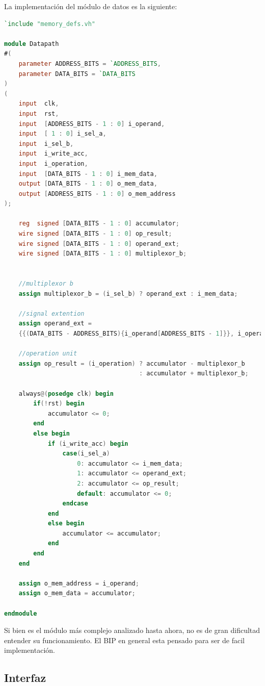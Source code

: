 \documentclass{article}
\begin{document}
\noindent La implementación del módulo de datos es la siguiente:

\begin{shaded}
\begin{lstlisting}[language=Verilog]
`include "memory_defs.vh"

module Datapath
#(
    parameter ADDRESS_BITS = `ADDRESS_BITS,
    parameter DATA_BITS = `DATA_BITS
)
(
    input  clk,
    input  rst,
    input  [ADDRESS_BITS - 1 : 0] i_operand,
    input  [ 1 : 0] i_sel_a,
    input  i_sel_b,
    input  i_write_acc,
    input  i_operation,
    input  [DATA_BITS - 1 : 0] i_mem_data,
    output [DATA_BITS - 1 : 0] o_mem_data,
    output [ADDRESS_BITS - 1 : 0] o_mem_address
);

    reg  signed [DATA_BITS - 1 : 0] accumulator;
    wire signed [DATA_BITS - 1 : 0] op_result;
    wire signed [DATA_BITS - 1 : 0] operand_ext;
    wire signed [DATA_BITS - 1 : 0] multiplexor_b;


    //multiplexor b
    assign multiplexor_b = (i_sel_b) ? operand_ext : i_mem_data;

    //signal extention
    assign operand_ext =
    {{(DATA_BITS - ADDRESS_BITS){i_operand[ADDRESS_BITS - 1]}}, i_operand};

    //operation unit
    assign op_result = (i_operation) ? accumulator - multiplexor_b
                                     : accumulator + multiplexor_b;

    always@(posedge clk) begin
        if(!rst) begin
            accumulator <= 0;
        end
        else begin
            if (i_write_acc) begin
                case(i_sel_a)
                    0: accumulator <= i_mem_data;
                    1: accumulator <= operand_ext;
                    2: accumulator <= op_result;
                    default: accumulator <= 0;
                endcase
            end
            else begin
                accumulator <= accumulator;
            end
        end
    end

    assign o_mem_address = i_operand;
    assign o_mem_data = accumulator;

endmodule
\end{lstlisting}
\end{shaded}

Si bien es el módulo más complejo analizado hasta ahora, no es de gran dificultad entender
su funcionamiento. El BIP en general esta pensado para ser de facil implementación.

\newpage

\subsection{Interfaz}
\end{document}
